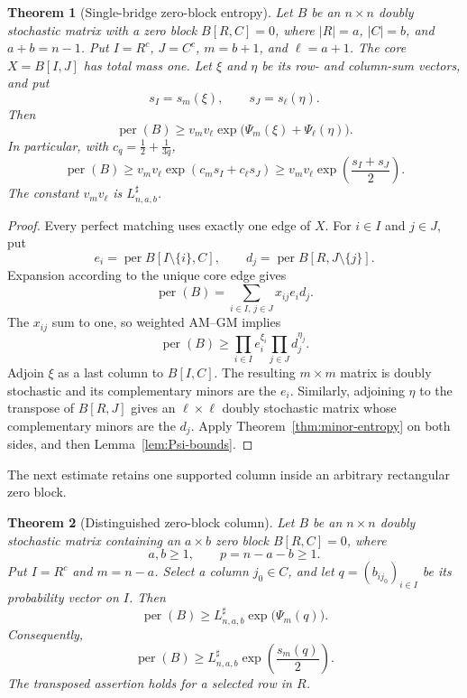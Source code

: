 \documentclass[11pt,a4paper]{article}
\numberwithin{equation}{section}
\newtheorem{theorem}{Theorem}[section]
\theoremstyle{definition}
\newcommand{\per}{\operatorname{per}}
\newcommand{\1}{\mathbf{1}}
\begin{document}
\begin{theorem}[Single-bridge zero-block entropy]\label{thm:single-bridge-entropy}
Let $B$ be an $n\times n$ doubly stochastic matrix with a zero block
$B[R,C]=0$, where $|R|=a$, $|C|=b$, and $a+b=n-1$.
Put $I=R^c$, $J=C^c$, $m=b+1$, and $\ell=a+1$.
The core $X=B[I,J]$ has total mass one.  Let $\xi$ and $\eta$ be its row-
and column-sum vectors, and put
\[
 s_I=s_m(\xi),\qquad s_J=s_\ell(\eta).
\]
Then
\begin{equation}\label{eq:single-bridge-entropy-exact}
 \per(B)\ge
 v_mv_\ell\exp\bigl(\Psi_m(\xi)+\Psi_\ell(\eta)\bigr).
\end{equation}
In particular, with $c_q=\frac12+\frac1{3q}$,
\begin{equation}\label{eq:single-bridge-entropy-strong}
 \per(B)\ge v_mv_\ell\exp(c_ms_I+c_\ell s_J)
 \ge v_mv_\ell\exp\left(\frac{s_I+s_J}{2}\right).
\end{equation}
The constant $v_mv_\ell$ is $L^{\sharp}_{n,a,b}$.
\end{theorem}

\begin{proof}
Every perfect matching uses exactly one edge of $X$.  For $i\in I$ and
$j\in J$, put
\[
 e_i=\per B[I\setminus\{i\},C],
 \qquad
 d_j=\per B[R,J\setminus\{j\}].
\]
Expansion according to the unique core edge gives
\[
 \per(B)=\sum_{i\in I,\,j\in J}x_{ij}e_id_j.
\]
The $x_{ij}$ sum to one, so weighted AM--GM implies
\[
 \per(B)\ge
 \prod_{i\in I}e_i^{\xi_i}
 \prod_{j\in J}d_j^{\eta_j}.
\]
Adjoin $\xi$ as a last column to $B[I,C]$.  The resulting $m\times m$
matrix is doubly stochastic and its complementary minors are the $e_i$.
Similarly, adjoining $\eta$ to the transpose of $B[R,J]$ gives an
$\ell\times\ell$ doubly stochastic matrix whose complementary minors are
the $d_j$.  Apply Theorem~\ref{thm:minor-entropy} on both sides, and then
Lemma~\ref{lem:Psi-bounds}.
\end{proof}

The next estimate retains one supported column inside an arbitrary
rectangular zero block.

\begin{theorem}[Distinguished zero-block column]\label{thm:distinguished-column}
Let $B$ be an $n\times n$ doubly stochastic matrix containing an
$a\times b$ zero block $B[R,C]=0$, where
\[
 a,b\ge1,\qquad p=n-a-b\ge1.
\]
Put $I=R^c$ and $m=n-a$.  Select a column $j_0\in C$, and let
$q=(b_{ij_0})_{i\in I}$ be its probability vector on $I$.  Then
\begin{equation}\label{eq:distinguished-column}
 \per(B)\ge
 L^{\sharp}_{n,a,b}\exp\bigl(\Psi_m(q)\bigr).
\end{equation}
Consequently,
\[
 \per(B)\ge
 L^{\sharp}_{n,a,b}\exp\left(\frac{s_m(q)}2\right).
\]
The transposed assertion holds for a selected row in $R$.
\end{theorem}
\end{document}
